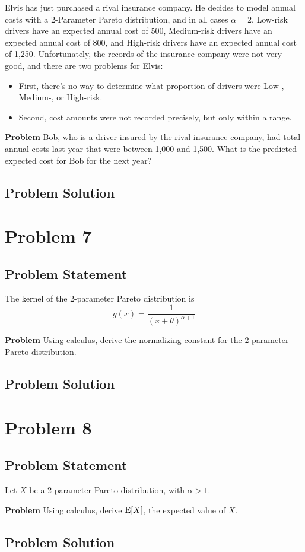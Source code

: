 \documentclass[12pt]{article}
\theoremstyle{definition}
\begin{document}
Elvis has just purchased a rival insurance company. He decides to model annual costs with a 2-Parameter Pareto distribution, and in all cases $\alpha = 2$. Low-risk drivers have an expected annual cost of 500, Medium-risk drivers have an expected annual cost of 800, and High-risk drivers have an expected annual cost of 1,250. Unfortunately, the records of the insurance company were not very good, and there are two problems for Elvis:
\begin{itemize}
	\item First, there's no way to determine what proportion of drivers were Low-, Medium-, or High-risk.
	\item Second, cost amounts were not recorded precisely, but only within a range.
\end{itemize}

\bigskip
\noindent
{\bf Problem} Bob, who is a driver insured by the rival insurance company, had total annual costs last year that were between 1,000 and 1,500. What is the predicted expected cost for Bob for the next year?


\subsection*{Problem Solution}




\newpage
\section*{Problem 7}

\subsection*{Problem Statement}

The kernel of the 2-parameter Pareto distribution is
$$
g(x) = \frac{1}{(x + \theta)^{\alpha + 1}}
$$

\bigskip
\noindent
{\bf Problem} Using calculus, derive the normalizing constant for the 2-parameter Pareto distribution.


\subsection*{Problem Solution}




\newpage
\section*{Problem 8}

\subsection*{Problem Statement}

Let $X$ be a 2-parameter Pareto distribution, with $\alpha > 1$.

\bigskip
\noindent
{\bf Problem} Using calculus, derive $\hbox{E}[X]$, the expected value of $X$.


\subsection*{Problem Solution}
\end{document}
